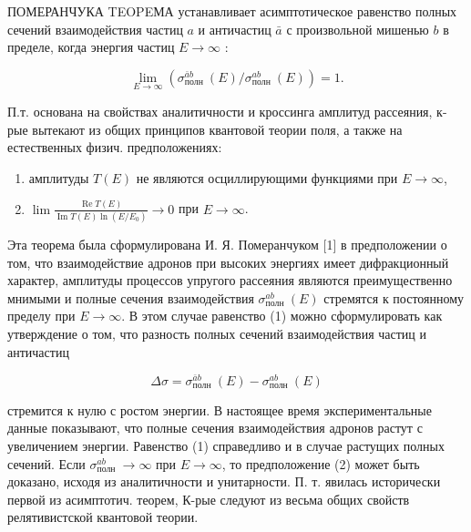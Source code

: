 \documentclass[10pt]{article}
\begin{document}
ПОМЕРАНЧУКА TEOPEМА устанавливает асимптотическое равенство полных сечений взаимодействия частиц $a$ и античастиц $\bar{a}$ с произвольной мишенью $b$ в пределе, когда энергия частиц $E \rightarrow \infty$ :



\[

\lim _{E \rightarrow \infty}\left(\sigma_{\text {полн }}^{\bar{a} b}(E) / \sigma_{\text {полн }}^{a b}(E)\right)=1 .

\]



П.т. основана на свойствах аналитичности и кроссинга амплитуд рассеяния, к-рые вытекают из общих принципов квантовой теории поля, а также на естественных физич. предположениях:



\begin{enumerate}

  \item амплитуды $T(E)$ не являются осциллирующими функциями при $E \rightarrow \infty$,



  \item $\lim \frac{\operatorname{Re} T(E)}{\operatorname{Im} T(E) \ln \left(E / E_{0}\right)} \rightarrow 0$ при $E \rightarrow \infty$.



\end{enumerate}



Эта теорема была сформулирована И. Я. Померанчуком [1] в предположении о том, что взаимодействие адронов при высоких энергиях имеет дифракционный характер, амплитуды процессов упругого рассеяния являются преимущественно мнимыми и полные сечения взаимодействия $\sigma_{\text {полн }}^{a b}(E)$ стремятся к постоянному пределу при $E \rightarrow \infty$. В этом случае равенство (1) можно сформулировать как утверждение о том, что разность полных сечений взаимодействия частиц и античастиц



\[

\Delta \sigma=\sigma_{\text {полн }}^{\bar{a} b}(E)-\sigma_{\text {полн }}^{a b}(E)

\]



стремится к нулю с ростом энергии. В настоящее время экспериментальные данные показывают, что полные сечения взаимодействия адронов растут с увеличением энергии. Равенство (1) справедливо и в случае растущих полных сечений. Если $\sigma_{\text {полн }}^{a b} \rightarrow \infty$ при $E \rightarrow \infty$, то предположение (2) может быть доказано, исходя из аналитичности и унитарности. П. т. явилась исторически первой из асимптотич. теорем, К-рые следуют из весьма общих свойств релятивистской квантовой теории.
\end{document}
